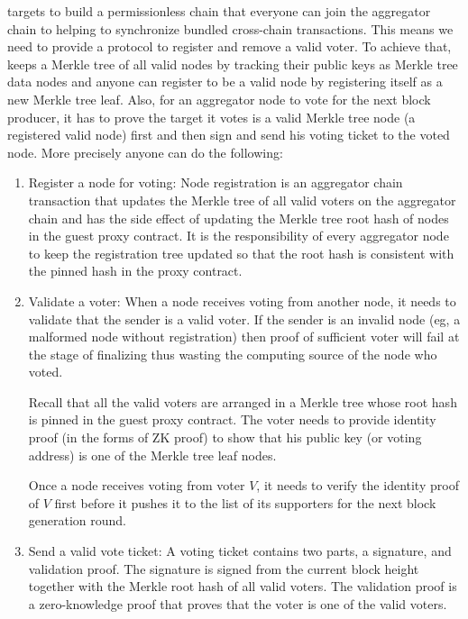 \dprotocol targets to build a permissionless chain that everyone can join the aggregator chain to helping to synchronize bundled cross-chain transactions. This means we need to provide a protocol to register and remove a valid voter. To achieve that, \dprotocol keeps a Merkle tree of all valid nodes by tracking their public keys as Merkle tree data nodes and anyone can register to be a valid node by registering itself as a new Merkle tree leaf. Also, for an aggregator node to vote for the next block producer, it has to prove the target it votes is a valid Merkle tree node (a registered valid node) first and then sign and send his voting ticket to the voted node. More precisely anyone can do the following:
\begin{enumerate}[leftmargin=*]
\item Register a node for voting:
    Node registration is an aggregator chain transaction that updates the Merkle tree of all valid voters on the aggregator chain and has the side effect of updating the Merkle tree root hash of nodes in the guest proxy contract. It is the responsibility of every aggregator node to keep the registration tree updated so that the root hash is consistent with the pinned hash in the proxy contract. 

\item Validate a voter:
    When a node receives voting from another node, it needs to validate that the sender is a valid voter. If the sender is an invalid node (eg, a malformed node without registration) then proof of sufficient voter will fail at the stage of finalizing thus wasting the computing source of the node who voted.

    Recall that all the valid voters are arranged in a Merkle tree whose root hash is pinned in the guest proxy contract. The voter needs to provide identity proof (in the forms of ZK proof) to show that his public key (or voting address) is one of the Merkle tree leaf nodes.
    
    Once a node receives voting from voter $V$, it needs to verify the identity proof of $V$ first before it pushes it to the list of its supporters for the next block generation round.

\item Send a valid vote ticket:
    A voting ticket contains two parts, a signature, and validation proof. The signature is signed from the current block height together with the Merkle root hash of all valid voters. The validation proof is a zero-knowledge proof that proves that the voter is one of the valid voters. 
\end{enumerate}

